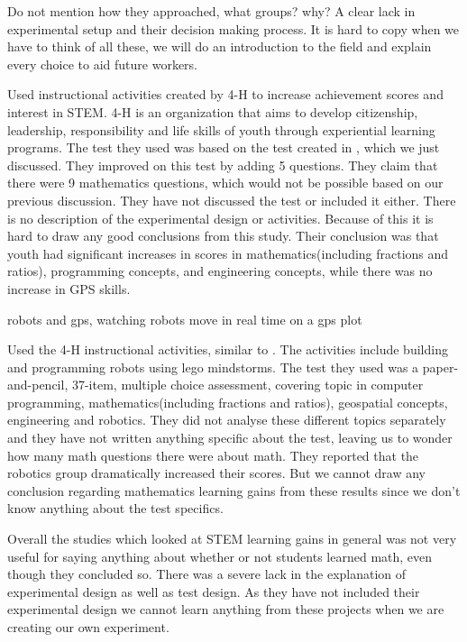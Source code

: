 \bigskip\noindent
\cite{barker2007robotics} Do not mention how they approached, what groups? why?
\cite{nugent2008effect} A clear lack in experimental setup and their decision making process. It is hard to copy when we have to think of all these, we will do an introduction to the field and explain every choice to aid future workers. 

\bigskip\noindent
\cite{nugent2008effect} Used instructional activities created by 4-H to increase achievement scores and interest in STEM. 4-H is an organization that aims to develop citizenship, leadership, responsibility and life skills of youth through experiential learning programs. The test they used was based on the test created in \cite{barker2007robotics}, which we just discussed. They improved on this test by adding 5 questions. They claim that there were 9 mathematics questions, which would not be possible based on our previous discussion. They have not discussed the test or included it either. There is no description of the experimental design or activities. Because of this it is hard to draw any good conclusions from this study. Their conclusion was that youth had significant increases in scores in mathematics(including fractions and ratios), programming concepts, and engineering concepts, while there was no increase in GPS skills.

\bigskip\noindent
\cite{nugent2008effect} robots and gps, watching robots move in real time on a gps plot

\bigskip\noindent
\cite{nugent2009use} Used the 4-H instructional activities, similar to \cite{nugent2008effect}. The activities include building and programming robots using lego mindstorms. The test they used was a paper-and-pencil, 37-item, multiple choice assessment, covering topic in computer programming, mathematics(including fractions and ratios), geospatial concepts, engineering and robotics. They did not analyse these different topics separately and they have not written anything specific about the test, leaving us to wonder how many math questions there were about math. They reported that the robotics group dramatically increased their scores. But we cannot draw any conclusion regarding mathematics learning gains from these results since we don't know anything about the test specifics.

\bigskip\noindent
Overall the studies which looked at STEM learning gains in general was not very useful for saying anything about whether or not students learned math, even though they concluded so. There was a severe lack in the explanation of experimental design as well as test design. As they have not included their experimental design we cannot learn anything from these projects when we are creating our own experiment. 

